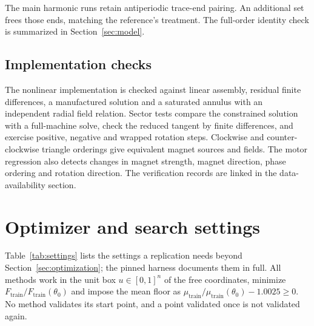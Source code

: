 \documentclass{anvil-paper}
\begin{document}
The main harmonic runs retain antiperiodic trace-end pairing. An additional
set frees those ends, matching the reference's treatment. The full-order
identity check is summarized in Section~\ref{sec:model}.

\subsection{Implementation checks}
The nonlinear implementation is checked against linear assembly, residual
finite differences, a manufactured solution and a saturated annulus with
an independent radial field relation. Sector tests compare the
constrained solution with a full-machine solve, check the reduced tangent
by finite differences, and exercise positive, negative and wrapped rotation
steps. Clockwise and counter-clockwise triangle orderings give equivalent
magnet sources and fields. The motor regression also detects changes in
magnet strength, magnet direction, phase ordering and rotation direction.
The verification records are linked in the data-availability section.

\section{Optimizer and search settings}\label{sec:settings}
Table~\ref{tab:settings} lists the settings a replication needs beyond
Section~\ref{sec:optimization}; the pinned harness documents them in full.
All methods work in the unit box $u\in[0,1]^n$ of the free coordinates,
minimize $F_{\mathrm{train}}/F_{\mathrm{train}}(\theta_0)$ and impose the
mean floor as $\mu_{\mathrm{train}}/\mu_{\mathrm{train}}(\theta_0)-1.0025\geq0$.
No method validates its start point, and a point validated once is not
validated again.
\end{document}
